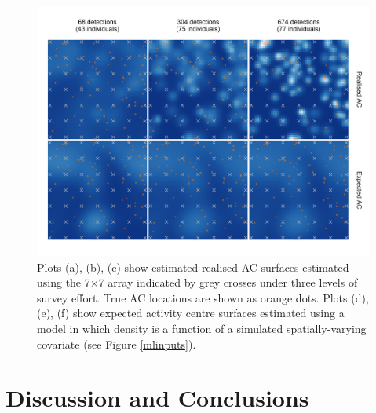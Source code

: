 \documentclass[useAMS,usenatbib,referee]{biom}
\begin{document}
\begin{figure}[htbp]
\centering
\includegraphics[width=1\textwidth]{mona_7x7.png}
\caption{Plots (a), (b), (c) show estimated realised AC surfaces estimated using the 7$\times$7 array indicated by grey crosses under three levels of survey effort. True AC locations are shown as orange dots. Plots (d), (e), (f) show expected activity centre surfaces estimated using a model in which density is a function of a simulated spatially-varying covariate (see Figure \ref{mlinputs}).}
\label{mona7x7}
\end{figure}

\section{Discussion and Conclusions} \label{discussion}
 
\end{document}
